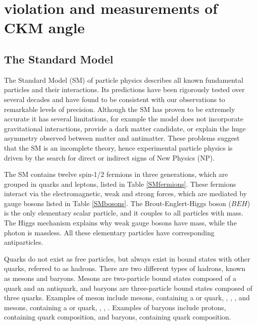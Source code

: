 %

\chapter{\label{ch:2-background}\CP violation and measurements of CKM angle \Pgamma} 

\minitoc

\section{The Standard Model}

The Standard Model (SM) of particle physics describes all known fundamental particles and their interactions. Its predictions have been rigorously tested over several decades and have found to be consistent with our observations to remarkable levels of precision. Although the SM has proven to be extremely accurate it has several limitations, for example the model does not incorporate gravitational interactions, provide a dark matter candidate, or explain the huge asymmetry observed between matter and antimatter. These problems suggest that the SM is an incomplete theory, hence experimental particle physics is driven by the search for direct or indirect signs of New Physics (NP).

The SM contains twelve spin-1/2 fermions in three generations, which are grouped in quarks and leptons, listed in Table \ref{SMfermions}. These fermions interact via the electromagnetic, weak and strong forces, which are mediated by gauge bosons listed in Table \ref{SMbosons}. The Brout-Englert-Higgs boson ($BEH$) is the only elementary scalar particle, and it couples to all particles with mass. The Higgs mechanism explains why weak gauge bosons have mass, while the photon is massless. All these elementary particles have corresponding antiparticles.

Quarks do not exist as free particles, but always exist in bound states with other quarks, referred to as hadrons. There are two different types of hadrons, known as mesons and baryons. Mesons are two-particle bound states composed of a quark and an antiquark, and baryons are three-particle bound states composed of three quarks. Examples of meson include \B mesons, containing a \bquark or \bquarkbar quark, \eg \Bm, \Bp, \Bz, and \D mesons, containing a \cquark or \cquarkbar quark, \eg \Dm, \Dp, \Dz. Examples of baryons include protons, containing \uquark\uquark\dquark quark composition, and \Lz baryons, containing \uquark\dquark\squark quark composition.

